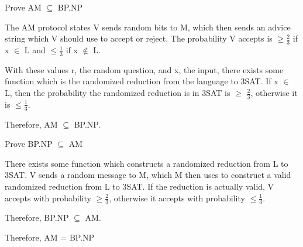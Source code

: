 \documentclass{article}
\begin{document}
Prove AM $\subseteq$ BP.NP

The AM protocol states V sends random bits to M, which then sends an advice string which V should use to accept or reject.  The probability V accepts is $\geq \frac23$ if x $\in$ L and $\leq \frac13$ if x $\notin$ L.

With these values r, the random question, and x, the input, there exists some function which is the randomized reduction from the language to 3SAT.  If x $\in$ L, then the probability the randomized reduction is in 3SAT is $\geq$ $\frac23$, otherwise it is $\leq \frac13$.  

Therefore, AM $\subseteq$ BP.NP.


\bigskip
Prove BP.NP $\subseteq$ AM

There exists some function which constructs a randomized reduction from L to 3SAT.  V sends a random message to M, which M then uses to construct a valid randomized reduction from L to 3SAT.  If the reduction is actually valid, V accepts with probability $\geq \frac23$, otherwise it accepts with probability $\leq \frac13$.

Therefore, BP.NP $\subseteq$ AM.

\medskip
Therefore, AM = BP.NP
\end{document}
